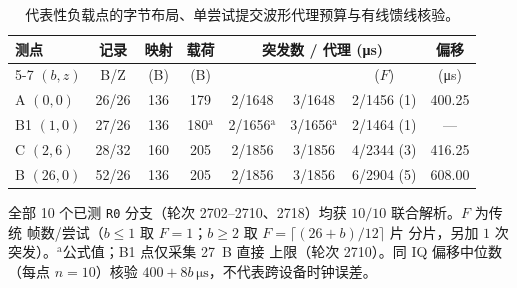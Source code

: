 \begin{table}[t]
\centering
\caption{代表性负载点的字节布局、单尝试提交波形代理预算与有线馈线核验。}
\label{tab:budget}
\setlength{\tabcolsep}{2.0pt}
\scriptsize
\begin{tabular}{@{}lccccccc@{}}
\toprule
\textbf{测点} & \textbf{记录} & \textbf{映射} & \textbf{\modejc{}载荷} & \multicolumn{3}{c}{\textbf{突发数 / 代理 (\si{\micro\second})}} & \textbf{偏移} \\
\cmidrule(lr){5-7}
$(b,z)$ & B/Z & (B) & (B) & \modejc{} & \modesc{} & \modelc{} ($F$) & (\si{\micro\second}) \\
\midrule
A $(0,0)$   & 26/26 & 136 & 179 & 2/\num{1648} & 3/\num{1648} & 2/\num{1456} (1) & 400.25 \\
B1 $(1,0)$  & 27/26 & 136 & 180$^{\mathrm{a}}$ & 2/\num{1656}$^{\mathrm{a}}$ & 3/\num{1656}$^{\mathrm{a}}$ & 2/\num{1464} (1) & --- \\
C $(2,6)$   & 28/32 & 160 & 205 & 2/\num{1856} & 3/\num{1856} & 4/\num{2344} (3) & 416.25 \\
B $(26,0)$  & 52/26 & 136 & 205 & 2/\num{1856} & 3/\num{1856} & 6/\num{2904} (5) & 608.00 \\
\bottomrule
\end{tabular}
\par\smallskip
\raggedright\scriptsize
全部 10 个已测 \texttt{R0} 分支（轮次 2702--2710、2718）均获 $10/10$ 联合解析。$F$ 为传统 \ble{} 帧数/尝试（$b\le 1$ 取 $F{=}1$；$b\ge 2$ 取 $F{=}\lceil(26{+}b)/12\rceil$ 片 \fragproto{} 分片，另加 $1$ 次 \stdfour{} 突发）。$^{\mathrm{a}}$公式值；B1 点仅采集 \SI{27}{B} 直接 \modelc{} 上限（轮次 2710）。同 IQ 偏移中位数（每点 $n{=}10$）核验 $400{+}8b\,\si{\micro\second}$，不代表跨设备时钟误差。
\end{table}
